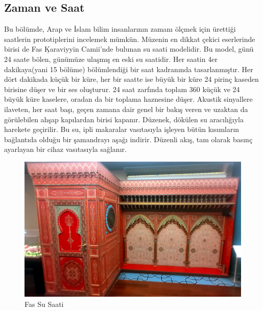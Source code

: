 \subsection{Zaman ve Saat}
\indent\indent Bu bölümde, Arap ve İslam bilim insanlarının zamanı ölçmek için ürettiği saatlerin prototiplerini incelemek mümkün. Müzenin en dikkat çekici eserlerinde birisi de Fas Ḳaraviyyīn Camii’nde bulunan su saati modelidir. Bu model, günü 24 saate bölen, günümüze ulaşmış en eski su saatidir. Her saatin 4er dakikaya(yani 15 bölüme) bölümlendiği bir saat kadranında tasarlanmıştır. Her dört dakikada küçük bir küre, her bir saatte ise büyük bir küre 24 pirinç kaseden birisine düşer ve bir ses oluşturur. 24 saat zarfında toplam 360 küçük ve 24 büyük küre kaselere, oradan da bir toplama haznesine düşer. Akustik sinyallere ilaveten, her saat başı, geçen zamana dair genel bir bakış veren ve uzaktan da görülebilen ahşap kapılardan birisi kapanır. Düzenek, dökülen su aracılığıyla harekete geçirilir. Bu su, ipli makaralar vasıtasıyla işleyen bütün kısımların bağlantıda olduğu bir şamandrayı aşağı indirir. Düzenli akış, tam olarak basınç ayarlayan bir cihaz vasıtasıyla sağlanır.\newline
\begin{figure}[H]
    \centering
    \includegraphics[width=0.95\linewidth]{assets/water_clock.jpg}
    \caption{Fas Su Saati}
\end{figure}

